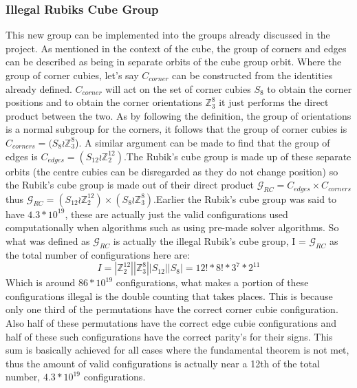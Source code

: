 \documentclass{article}
\newcounter{theo}[section]\setcounter{theo}{0}
\newcounter{lem}[section]\setcounter{lem}{0}
\begin{document}
\subsubsection{Illegal Rubiks Cube Group}
This new group can be implemented into the groups already discussed in the project. As mentioned in the context of the cube, the group of corners and edges can be described as being in separate orbits of the cube group orbit. Where the group of corner cubies, let's say $C_{corner}$ can be constructed from the identities already defined. $C_{corner}$ will act on the set of corner cubies $S_{8}$ to obtain the corner positions and to obtain the corner orientations $\mathbb{Z}_{3}^{8}$ it just performs the direct product between the two. As by following the definition, the group of orientations is a normal subgroup for the corners, it follows that the group of corner cubies is $C_{corners} = (S_8 \wr \mathbb{Z}_{3}^{8}$). A similar argument can be made to find that the group of edges is $C_{edges} = (S_{12} \wr \mathbb{Z}_{2}^{12})$.\newline The Rubik's cube group is made up of these separate orbits (the centre cubies can be disregarded as they do not change position) so the Rubik's cube group is made out of their direct product $\mathcal{G}_{RC} = C_{edges} \times C_{corners}$ thus $\mathcal{G}_{RC} = (S_{12} \wr \mathbb{Z}_{2}^{12}) \times (S_8 \wr \mathbb{Z}_{3}^{8})$.\newline Earlier the Rubik's cube group was said to have $4.3*10^{19}$, these are actually just the valid configurations used computationally when algorithms such as using pre-made solver algorithms. So what was defined as $\mathcal{G}_{RC}$ is actually the illegal Rubik's cube group, I = $\mathcal{G}_{RC}$ as the total number of configurations here are:
\begin{equation}\label{23}
I = |\mathbb{Z}_{2}^{12}||\mathbb{Z}_{3}^{8}||S_{12}||S_8| =  12! * 8! * 3^7 * 2^{11}
\end{equation}
Which is around $86 * 10^{19}$ configurations, what makes a portion of these configurations illegal is the double counting that takes places. This is because only one third of the permutations have the correct corner cubie configuration. Also half of these permutations have the correct edge cubie configurations and half of these such configurations have the correct parity's for their signs. This sum is basically achieved for all cases where the fundamental theorem is not met, thus the amount of valid configurations is actually near a 12th of the total number,  $4.3*10^{19}$ configurations. 
\end{document}
